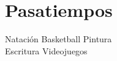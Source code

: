 \section{Pasatiempos \faGamepad}
Natación \textbullet{} Basketball \textbullet{} Pintura\\ 
Escritura \textbullet{} Videojuegos
\sectionsep
